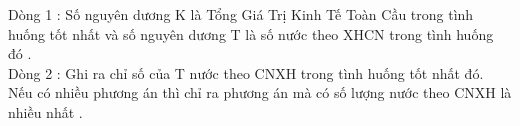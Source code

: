 Dòng 1 : Số nguyên dương K là Tổng Giá Trị Kinh Tế Toàn Cầu trong tình huống tốt nhất và số nguyên dương T là số nước theo XHCN trong tình huống đó .   
\\   Dòng 2 : Ghi ra chỉ số của T nước theo CNXH trong tình huống tốt nhất đó. Nếu có nhiều phương án thì chỉ ra phương án mà có số lượng nước theo CNXH là nhiều nhất .